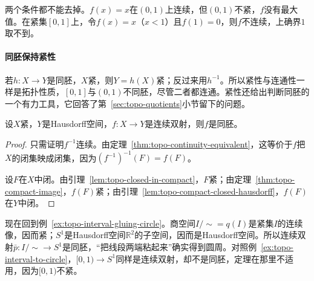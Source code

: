 两个条件都不能去掉。$f(x)=x$在$(0,1)$上连续，但$(0,1)$不紧，$f$没有最大值。在紧集$[0,1]$上，令$f(x)=x$（$x<1$）且$f(1)=0$，则$f$不连续，上确界$1$取不到。

\paragraph{同胚保持紧性}
若$h:X\to Y$是同胚，$X$紧，则$Y=h(X)$紧；反过来用$h^{-1}$。所以紧性与连通性一样是拓扑性质，$[0,1]$与$(0,1)$不同胚，尽管二者都连通。紧性还给出判断同胚的一个有力工具，它回答了第~\ref{sec:topo-quotients}小节留下的问题。

\begin{theorem}[从紧空间到Hausdorff空间的连续双射]
\label{thm:topo-compact-hausdorff-homeomorphism}
设$X$紧，$Y$是Hausdorff空间，$f:X\to Y$是连续双射，则$f$是同胚。
\end{theorem}
\begin{proof}
只需证明$f^{-1}$连续。由定理~\ref{thm:topo-continuity-equivalent}，这等价于$f$把$X$的闭集映成闭集，因为$(f^{-1})^{-1}(F)=f(F)$。

设$F$在$X$中闭。由引理~\ref{lem:topo-closed-in-compact}，$F$紧；由定理~\ref{thm:topo-compact-image}，$f(F)$紧；由引理~\ref{lem:topo-compact-closed-hausdorff}，$f(F)$在$Y$中闭。
\end{proof}

现在回到例~\ref{ex:topo-interval-gluing-circle}。商空间$I/{\sim}=q(I)$是紧集$I$的连续像，因而紧；$S^1$是Hausdorff空间$\mathbb R^2$的子空间，因而是Hausdorff空间。所以连续双射$\bar p:I/{\sim}\to S^1$是同胚，“把线段两端粘起来”确实得到圆周。对照例~\ref{ex:topo-interval-to-circle}，$[0,1)\to S^1$同样是连续双射，却不是同胚，定理在那里不适用，因为$[0,1)$不紧。
